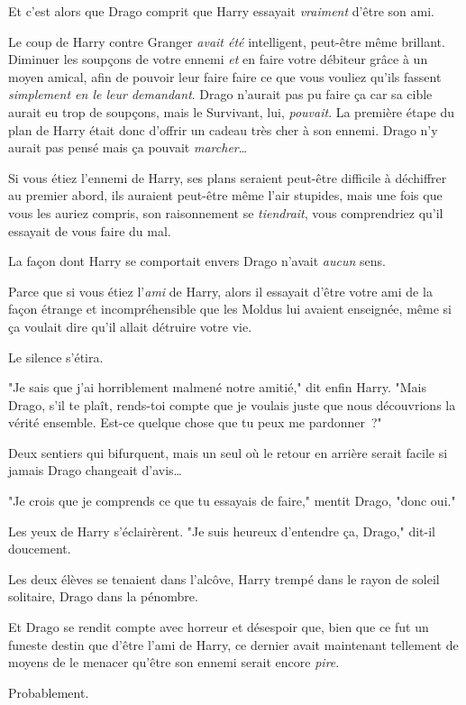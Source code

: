 Et c'est alors que Drago comprit que Harry essayait \emph{vraiment} d'être son ami.

Le coup de Harry contre Granger \emph{avait été} intelligent, peut-être même brillant. Diminuer les soupçons de votre ennemi \emph{et} en faire votre débiteur grâce à un moyen amical, afin de pouvoir leur faire faire ce que vous vouliez qu'ils fassent \emph{simplement en le leur demandant}. Drago n'aurait pas pu faire ça car sa cible aurait eu trop de soupçons, mais le Survivant, lui, \emph{pouvait}. La première étape du plan de Harry était donc d'offrir un cadeau très cher à son ennemi. Drago n'y aurait pas pensé mais ça pouvait \emph{marcher}…

Si vous étiez l'ennemi de Harry, ses plans seraient peut-être difficile à déchiffrer au premier abord, ils auraient peut-être même l'air stupides, mais une fois que vous les auriez compris, son raisonnement se \emph{tiendrait}, vous comprendriez qu'il essayait de vous faire du mal.

La façon dont Harry se comportait envers Drago n'avait \emph{aucun} sens.

Parce que si vous étiez l'\emph{ami} de Harry, alors il essayait d'être votre ami de la façon étrange et incompréhensible que les Moldus lui avaient enseignée, même si ça voulait dire qu'il allait détruire votre vie.

Le silence s'étira.

"Je sais que j'ai horriblement malmené notre amitié," dit enfin Harry. "Mais Drago, s'il te plaît, rends-toi compte que je voulais juste que nous découvrions la vérité ensemble. Est-ce quelque chose que tu peux me pardonner~?"

Deux sentiers qui bifurquent, mais un seul où le retour en arrière serait facile si jamais Drago changeait d'avis…

"Je crois que je comprends ce que tu essayais de faire," mentit Drago, "donc oui."

Les yeux de Harry s'éclairèrent. "Je suis heureux d'entendre ça, Drago," dit-il doucement.

Les deux élèves se tenaient dans l'alcôve, Harry trempé dans le rayon de soleil solitaire, Drago dans la pénombre.

Et Drago se rendit compte avec horreur et désespoir que, bien que ce fut un funeste destin que d'être l'ami de Harry, ce dernier avait maintenant tellement de moyens de le menacer qu'être son ennemi serait encore \emph{pire}.

Probablement.

